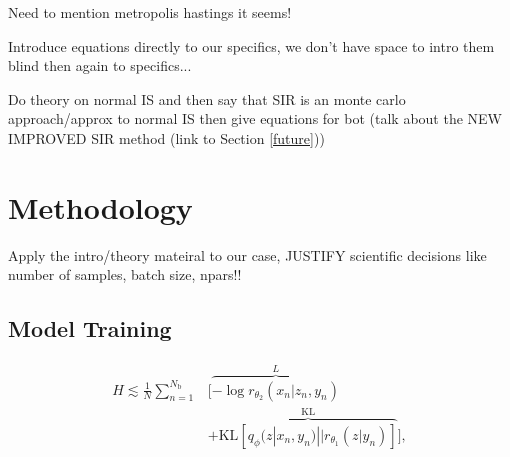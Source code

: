 \documentclass[aps,superscriptaddress,twocolumn,nopreprintnumbers,floatfix,groupedaddress]{revtex4-1}
\begin{document}

Need to mention metropolis hastings it seems!

Introduce equations directly to our specifics, we don't have space to intro them blind then again to specifics...



Do theory on normal IS and then say that SIR is an monte carlo approach/approx to normal IS then give equations for bot (talk about the NEW IMPROVED SIR method (link to Section \ref{future}))

%

\section{Methodology}\label{methods}

Apply the intro/theory mateiral to our case, JUSTIFY scientific decisions like number of samples, batch size, npars!!

\subsection{Model Training}

\begin{align}\label{eq:cost_approx} H \lesssim
\frac{1}{N}\sum_{n=1}^{N_{\text{b}}}&\Big[\overbrace{-\log
	r_{\theta_{2}}(x_{n}|z_{n},y_{n})}^{L}\nonumber\\
&+\overbrace{\text{KL}\left[q_{\phi}(z|x_{n},y_{n})||r_{\theta_{1}}(z|y_{n})\right]}^{\text{KL}}\Big],
\end{align}
\end{document}
